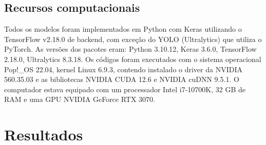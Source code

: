 \documentclass[12pt]{article}
\begin{document}
\subsection{Recursos computacionais}
\label{sec:resources}

Todos os modelos foram implementados em Python com Keras utilizando o TensorFlow v2.18.0 de backend, com exceção do YOLO (Ultralytics) que utiliza o PyTorch. As versões dos pacotes eram: Python 3.10.12, Keras 3.6.0, TensorFlow 2.18.0, Ultralytics 8.3.18.
Os códigos foram executados com o sistema operacional Pop!\_OS 22.04, kernel Linux 6.9.3, contendo instalado o driver da NVIDIA 560.35.03 e as bibliotecas NVIDIA CUDA 12.6 e NVIDIA cuDNN 9.5.1.
O computador estava equipado com um processador Intel i7-10700K, 32 GB de RAM e uma GPU NVIDIA GeForce RTX 3070.

\section{Resultados}
\label{sec:results}





\end{document}
